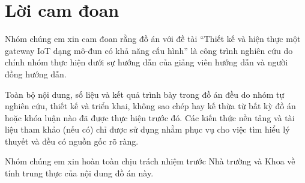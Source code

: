 \chapter*{Lời cam đoan}
Nhóm chúng em xin cam đoan rằng đồ án với đề tài “Thiết kế và hiện thực một gateway IoT dạng mô-đun có khả năng cấu hình” là công trình nghiên cứu do chính nhóm thực hiện dưới sự hướng dẫn của giảng viên hướng dẫn và người đồng hướng dẫn.

Toàn bộ nội dung, số liệu và kết quả trình bày trong đồ án đều do nhóm tự nghiên cứu, thiết kế và triển khai, không sao chép hay kế thừa từ bất kỳ đồ án hoặc khóa luận nào đã được thực hiện trước đó. Các kiến thức nền tảng và tài liệu tham khảo (nếu có) chỉ được sử dụng nhằm phục vụ cho việc tìm hiểu lý thuyết và đều có nguồn gốc rõ ràng.

Nhóm chúng em xin hoàn toàn chịu trách nhiệm trước Nhà trường và Khoa về tính trung thực của nội dung đồ án này.